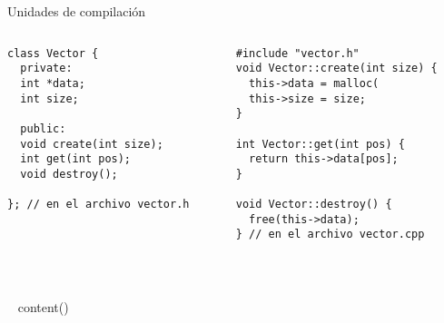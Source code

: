 \begin{frame}{Unidades de compilaci\'on}{}
   \begin{columns}[t]
      \begin{column}{.4\linewidth}
        \begin{lstlisting}[style=normal,firstnumber=1]
class Vector {
  private:
  int *data;
  int size;

  public:
  void create(int size);
  int get(int pos);
  void destroy();

}; // en el archivo vector.h
        \end{lstlisting}
     \end{column}
     \begin{column}{.4\linewidth}
        \begin{lstlisting}[style=normal,firstnumber=1]
#include "vector.h"
void Vector::create(int size) {
  this->data = malloc(
  this->size = size;
}

int Vector::get(int pos) {
  return this->data[pos];
}

void Vector::destroy() {
  free(this->data);
} // en el archivo vector.cpp
        \end{lstlisting}
    \end{column}
\end{columns}
\end{frame}

~%

~{ content() }~





